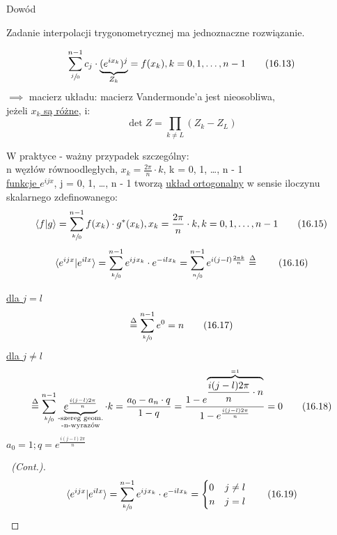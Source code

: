 \begin{frame}[allowframebreaks]{Dowód}
	\begin{theorem}
		Zadanie interpolacji trygonometrycznej ma jednoznaczne rozwiązanie.
	\end{theorem}
	\begin{proofs}
		\[
			\sum\limits_{\sfrac{j}{0}}^{n-1} c_j \cdot \underbrace{(e^{ix_k})^j}_{Z_k} = f(x_k), k = 0, 1, \dots, n-1
			\tag{16.13}
		\]
		$\implies$ macierz układu: macierz Vandermonde'a jest nieosobliwa, \\ jeżeli \underline{$x_k$ są różne}, i:
		\[
			\det Z = \prod_{k \neq L} (Z_k - Z_L)
			\tag{16.14}
		\]
	\end{proofs}
	\begin{proofs}
		W praktyce - ważny przypadek szczególny: \\
		n węzłów równoodległych, \underline{$x_k = \frac{2\pi}{n}\cdot k$}, k = 0, 1, \dots, n - 1 \\
		\underline{funkcje $e^{ijx}$}, j = 0, 1, \dots, n - 1 tworzą \underline{układ ortogonalny} w sensie iloczynu skalarnego zdefinowanego: \\
		\[
			\langle f|g \rangle = \sum\limits_{\sfrac{k}{0}}^{n-1} f(x_k) \cdot g^* (x_k), x_k = \frac{2\pi}{n} \cdot k, k = 0, 1, \dots, n-1
			\tag{16.15}
		\]
		\[
			\langle e^{ijx}|e^{ilx} \rangle = \sum\limits_{\sfrac{k}{0}}^{n-1} e^{ijx_k}  \cdot e^{-ilx_k} = \sum\limits_{\sfrac{n}{0}}^{n-1} e^{i(j - l) \frac{2\pi k}{n}}\stackrel{\Delta}{=}
			\tag{16.16}
		\]
	\end{proofs}
	\begin{proofs}
		\underline{dla $j = l$}
		\[
			\stackrel{\Delta}{=} \sum\limits_{\sfrac{k}{0}}^{n-1} e^0 = n
			\tag{16.17}
		\]
		\underline{dla $j \neq l$}
		\[
			\stackrel{\Delta}{=} \sum\limits_{\sfrac{k}{0}}^{n-1} \underbrace{e^{\frac{i(j - l)2\pi}{n}}}_{\substack{
				\text{-szereg geom.} \\
				\text{-n-wyrazów}
			}} \cdot k = \frac{a_0 - a_n \cdot q}{1 - q} = \frac{1 - e ^{\overbrace{\frac{i(j - l)2\pi}{n} \cdot n}^{=1}}}{1 - e^{\frac{i(j -  l)2\pi}{n}}} = 0
			\tag{16.18}
		\]
		$a_0 = 1; q = e^{\frac{i(j -  l)2\pi}{n}}$
	\end{proofs}
	\begin{proof}[\proofname\ (Cont.)]
		\[
			\langle e^{ijx}|e^{ilx} \rangle = \sum\limits_{\sfrac{k}{0}}^{n - 1}e^{ijx_k}  \cdot e^{-ilx_k} = 
			\begin{cases}
				0 & j \neq l \\
				n & j = l
			\end{cases}
			\tag{16.19}
		\]
	\end{proof}
\end{frame}
